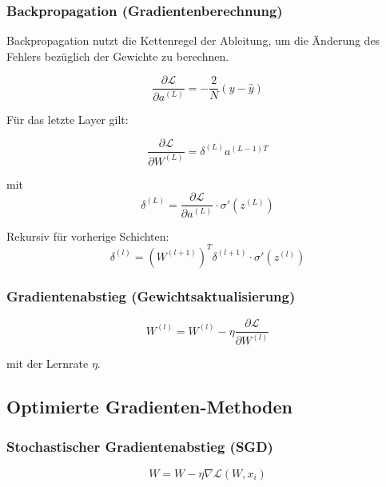 \subsubsection{Backpropagation (Gradientenberechnung)}

Backpropagation nutzt die Kettenregel der Ableitung, um die Änderung des Fehlers bezüglich der Gewichte zu berechnen.

\begin{equation}
	\frac{\partial \mathcal{L}}{\partial a^{(L)}} = -\frac{2}{N} (y - \hat{y})
\end{equation}

Für das letzte Layer gilt:

\begin{equation} 
	\dfrac{\partial \mathcal{L}}{\partial W^{(L)}} = \delta^{(L)}  a^{(L-1)T}
\end{equation}

mit
\begin{equation}
	\delta^{(L)} = \frac{\partial \mathcal{L}}{\partial a^{(L)}} \cdot \sigma'(z^{(L)})
\end{equation}

Rekursiv für vorherige Schichten:
\begin{equation}
	\delta^{(l)} = (W^{(l+1)})^T \delta^{(l+1)} \cdot \sigma'(z^{(l)})
\end{equation}

\subsubsection{Gradientenabstieg (Gewichtsaktualisierung)}

\begin{equation}
	W^{(l)} = W^{(l)} - \eta \frac{\partial \mathcal{L}}{\partial W^{(l)}}
\end{equation}

mit der Lernrate $ \eta $.

\subsection{Optimierte Gradienten-Methoden}

\subsubsection{Stochastischer Gradientenabstieg (SGD)}
\begin{equation}
	W = W - \eta \nabla \mathcal{L}(W, x_i)
\end{equation}

